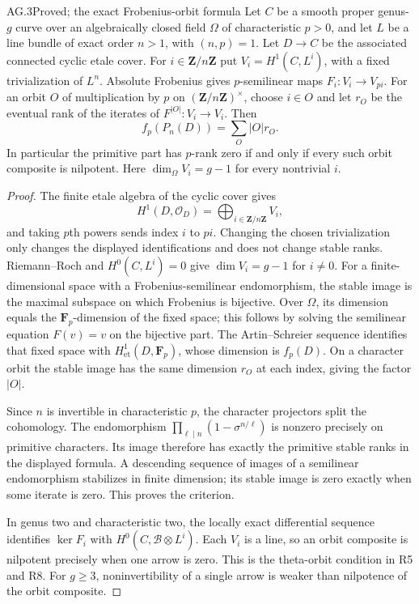 \begin{claim}{AG.3}{Proved; the exact Frobenius-orbit formula}
Let $C$ be a smooth proper genus-$g$ curve over an algebraically
closed field $\Omega$ of characteristic $p>0$, and let $L$ be a
line bundle of exact order $n>1$, with $(n,p)=1$. Let
$D\to C$ be the associated connected cyclic etale cover. For
$i\in\mathbf Z/n\mathbf Z$ put $V_i=H^1(C,L^i)$, with a fixed
trivialization of $L^n$. Absolute Frobenius gives $p$-semilinear
maps $F_i:V_i\to V_{pi}$. For an orbit $O$ of multiplication
by $p$ on $(\mathbf Z/n\mathbf Z)^\times$, choose $i\in O$
and let $r_O$ be the eventual rank of the iterates of
$F^{|O|}:V_i\to V_i$. Then
\[
                  f_p(P_n(D))=\sum_O |O|r_O.
\]
In particular the primitive part has $p$-rank zero if and only
if every such orbit composite is nilpotent. Here
$\dim_\Omega V_i=g-1$ for every nontrivial $i$.
\end{claim}
\begin{proof}
The finite etale algebra of the cyclic cover gives
\[
 H^1(D,\mathcal O_D)=\bigoplus_{i\in\mathbf Z/n\mathbf Z}V_i,
\]
and taking $p$th powers sends index $i$ to $pi$. Changing the
chosen trivialization only changes the displayed identifications
and does not change stable ranks. Riemann--Roch and
$H^0(C,L^i)=0$ give $\dim V_i=g-1$ for $i\ne0$.
For a finite-dimensional space with a Frobenius-semilinear
endomorphism, the stable image is the maximal subspace on which
Frobenius is bijective. Over $\Omega$, its dimension equals the
$\mathbf F_p$-dimension of the fixed space; this follows by
solving the semilinear equation $F(v)=v$ on the bijective part.
The Artin--Schreier sequence identifies that fixed space with
$H^1_{\mathrm{et}}(D,\mathbf F_p)$, whose dimension is $f_p(D)$.
On a character orbit the stable image has the same dimension
$r_O$ at each index, giving the factor $|O|$.

Since $n$ is invertible in characteristic $p$, the character
projectors split the cohomology. The endomorphism
$\prod_{\ell\mid n}(1-\sigma^{n/\ell})$ is nonzero precisely
on primitive characters. Its image therefore has exactly the
primitive stable ranks in the displayed formula. A descending
sequence of images of a semilinear endomorphism stabilizes in
finite dimension; its stable image is zero exactly when some
iterate is zero. This proves the criterion.

In genus two and characteristic two, the locally exact
differential sequence identifies $\ker F_i$ with
$H^0(C,\mathcal B\otimes L^i)$. Each $V_i$ is a line, so an
orbit composite is nilpotent precisely when one arrow is zero.
This is the theta-orbit condition in R5 and R8. For $g\ge3$,
noninvertibility of a single arrow is weaker than nilpotence
of the orbit composite.
\end{proof}

